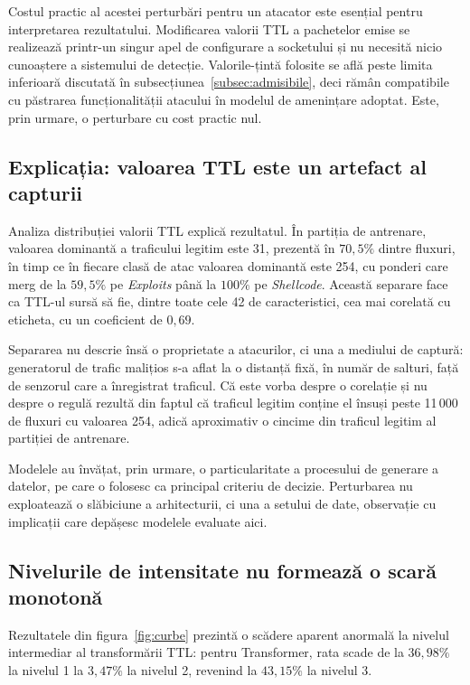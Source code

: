 Costul practic al acestei perturbări pentru un atacator este esențial pentru interpretarea rezultatului. Modificarea valorii TTL a pachetelor emise se realizează printr-un singur apel de configurare a socketului și nu necesită nicio cunoaștere a sistemului de detecție. Valorile-țintă folosite se află peste limita inferioară discutată în subsecțiunea~\ref{subsec:admisibile}, deci rămân compatibile cu păstrarea funcționalității atacului în modelul de amenințare adoptat. Este, prin urmare, o perturbare cu cost practic nul.

\subsection{Explicația: valoarea TTL este un artefact al capturii}\label{subsec:artefact}

Analiza distribuției valorii TTL explică rezultatul. În partiția de antrenare, valoarea dominantă a traficului legitim este 31, prezentă în $70{,}5\%$ dintre fluxuri, în timp ce în fiecare clasă de atac valoarea dominantă este 254, cu ponderi care merg de la $59{,}5\%$ pe \textit{Exploits} până la $100\%$ pe \textit{Shellcode}. Această separare face ca TTL-ul sursă să fie, dintre toate cele 42 de caracteristici, cea mai corelată cu eticheta, cu un coeficient de $0{,}69$.

Separarea nu descrie însă o proprietate a atacurilor, ci una a mediului de captură: generatorul de trafic malițios s-a aflat la o distanță fixă, în număr de salturi, față de senzorul care a înregistrat traficul. Că este vorba despre o corelație și nu despre o regulă rezultă din faptul că traficul legitim conține el însuși peste 11\,000 de fluxuri cu valoarea 254, adică aproximativ o cincime din traficul legitim al partiției de antrenare.

Modelele au învățat, prin urmare, o particularitate a procesului de generare a datelor, pe care o folosesc ca principal criteriu de decizie. Perturbarea nu exploatează o slăbiciune a arhitecturii, ci una a setului de date, observație cu implicații care depășesc modelele evaluate aici.

\subsection{Nivelurile de intensitate nu formează o scară monotonă}\label{subsec:nemonoton}

Rezultatele din figura~\ref{fig:curbe} prezintă o scădere aparent anormală la nivelul intermediar al transformării TTL: pentru Transformer, rata scade de la $36{,}98\%$ la nivelul 1 la $3{,}47\%$ la nivelul 2, revenind la $43{,}15\%$ la nivelul 3.

